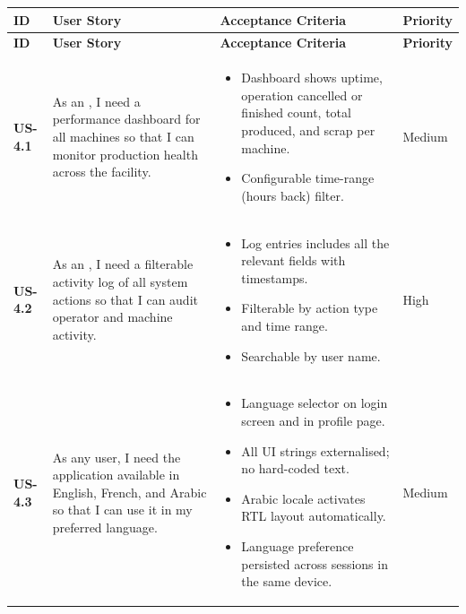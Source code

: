 \begin{longtable}{p{1.5cm} p{5cm} p{6.5cm} p{2cm}}
	\hline
	\textbf{ID} & \textbf{User Story} & \textbf{Acceptance Criteria} & \textbf{Priority} \\
	\hline
	\endfirsthead
	\hline
	\textbf{ID} & \textbf{User Story} & \textbf{Acceptance Criteria} & \textbf{Priority} \\
	\hline
	\endhead

	\endlastfoot

	\textbf{US-4.1} &
	As an \userrole{Supervisor}, I need a performance dashboard for all
	machines so that I can monitor production health across the facility.
	&
	\begin{itemize}[nosep, leftmargin=*]
	\item Dashboard shows uptime, operation cancelled or finished count, total produced, and scrap
	per machine.
	\item Configurable time-range (hours back) filter.
	\end{itemize}
	& Medium \\ \midrule

	\textbf{US-4.2} &
	As an \userrole{Administrator}, I need a filterable activity log
	of all system actions so that I can audit operator and machine activity.
	&
	\begin{itemize}[nosep, leftmargin=*]
	\item Log entries includes all the relevant fields with timestamps.
	\item Filterable by action type and time range.
	\item Searchable by user name.
	\end{itemize}
	& High \\ \midrule


	\textbf{US-4.3} &
	As any user, I need the application available in English, French, and Arabic
	so that I can use it in my preferred language.
	&
	\begin{itemize}[nosep, leftmargin=*]
	\item Language selector on login screen and in profile page.
	\item All UI strings externalised; no hard-coded text.
	\item Arabic locale activates RTL layout automatically.
	\item Language preference persisted across sessions in the same device.
	\end{itemize}
	& Medium \\ \midrule


\end{longtable}
